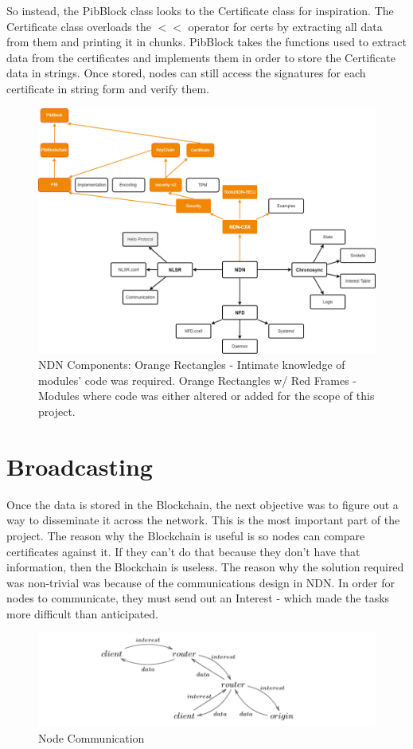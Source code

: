 So instead, the PibBlock class looks to the Certificate class for inspiration. The Certificate class overloads the $<<$ operator for certs by extracting all data from them and printing it in chunks. PibBlock takes the functions used to extract data from the certificates and implements them in order to store the Certificate data in strings. Once stored, nodes can still access the signatures for each certificate in string form and verify them.
\vfill
\begin{figure}[h]
\includegraphics[width=6in]{NDN.png}
\caption{
NDN Components: Orange Rectangles - Intimate knowledge of modules' code was required. Orange Rectangles w/ Red Frames - Modules where code was either altered or added for the scope of this project.}
\end{figure}
\section{Broadcasting}
Once the data is stored in the Blockchain, the next objective was to figure out a way to disseminate it across the network. This is the most important part of the project. The reason why the Blockchain is useful is so nodes can compare certificates against it. If they can't do that because they don't have that information, then the Blockchain is useless. The reason why the solution required was non-trivial was because of the communications design in NDN. In order for nodes to communicate, they must send out an Interest - which made the tasks more difficult than anticipated. \par 
\begin{figure}[h]
\includegraphics[width=6in]{comms.png}
\caption{Node Communication\cite{051}}
\end{figure}

